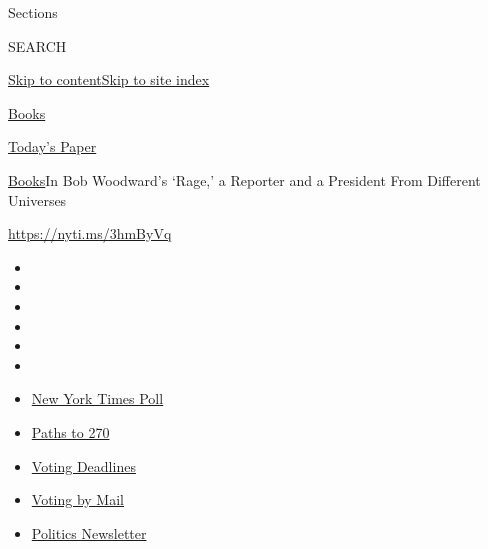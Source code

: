 Sections

SEARCH

\protect\hyperlink{site-content}{Skip to
content}\protect\hyperlink{site-index}{Skip to site index}

\href{https://www.nytimes3xbfgragh.onion/section/books}{Books}

\href{https://myaccount.nytimes3xbfgragh.onion/auth/login?response_type=cookie\&client_id=vi}{}

\href{https://www.nytimes3xbfgragh.onion/section/todayspaper}{Today's
Paper}

\href{/section/books}{Books}\textbar{}In Bob Woodward's `Rage,' a
Reporter and a President From Different Universes

\url{https://nyti.ms/3hmByVq}

\begin{itemize}
\item
\item
\item
\item
\item
\item
\end{itemize}

\begin{itemize}
\item
  \href{https://www.nytimes3xbfgragh.onion/2020/09/12/us/politics/biden-trump-poll-wisconsin-minnesota.html?action=click\&pgtype=Article\&state=default\&region=TOP_BANNER\&context=storylines_menu}{New
  York Times Poll}
\item
  \href{https://www.nytimes3xbfgragh.onion/interactive/2020/us/elections/election-states-biden-trump.html?action=click\&pgtype=Article\&state=default\&region=TOP_BANNER\&context=storylines_menu}{Paths
  to 270}
\item
  \href{https://www.nytimes3xbfgragh.onion/interactive/2019/us/elections/2020-presidential-election-calendar.html?action=click\&pgtype=Article\&state=default\&region=TOP_BANNER\&context=storylines_menu}{Voting
  Deadlines}
\item
  \href{https://www.nytimes3xbfgragh.onion/interactive/2020/08/31/us/politics/vote-by-mail-deadlines.html?action=click\&pgtype=Article\&state=default\&region=TOP_BANNER\&context=storylines_menu}{Voting
  by Mail}
\item
  \href{https://www.nytimes3xbfgragh.onion/newsletters/politics?action=click\&pgtype=Article\&state=default\&region=TOP_BANNER\&context=storylines_menu}{Politics
  Newsletter}
\end{itemize}


